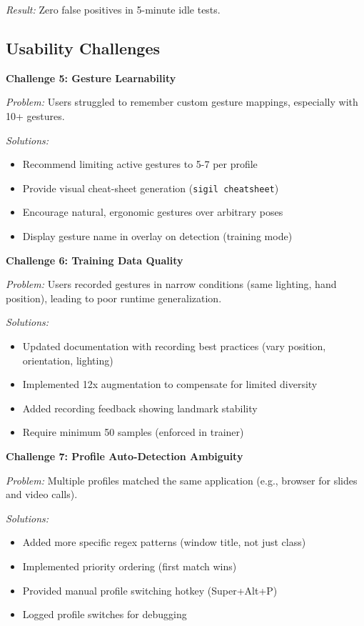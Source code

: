 \documentclass[11pt,a4paper]{article}
\begin{document}
\textit{Result:} Zero false positives in 5-minute idle tests.

\subsection{Usability Challenges}

\textbf{Challenge 5: Gesture Learnability}

\textit{Problem:} Users struggled to remember custom gesture mappings, especially with 10+ gestures.

\textit{Solutions:}
\begin{itemize}
\item Recommend limiting active gestures to 5-7 per profile
\item Provide visual cheat-sheet generation (\texttt{sigil cheatsheet})
\item Encourage natural, ergonomic gestures over arbitrary poses
\item Display gesture name in overlay on detection (training mode)
\end{itemize}

\textbf{Challenge 6: Training Data Quality}

\textit{Problem:} Users recorded gestures in narrow conditions (same lighting, hand position), leading to poor runtime generalization.

\textit{Solutions:}
\begin{itemize}
\item Updated documentation with recording best practices (vary position, orientation, lighting)
\item Implemented 12x augmentation to compensate for limited diversity
\item Added recording feedback showing landmark stability
\item Require minimum 50 samples (enforced in trainer)
\end{itemize}

\textbf{Challenge 7: Profile Auto-Detection Ambiguity}

\textit{Problem:} Multiple profiles matched the same application (e.g., browser for slides and video calls).

\textit{Solutions:}
\begin{itemize}
\item Added more specific regex patterns (window title, not just class)
\item Implemented priority ordering (first match wins)
\item Provided manual profile switching hotkey (Super+Alt+P)
\item Logged profile switches for debugging
\end{itemize}
\end{document}
